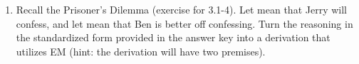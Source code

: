 \begin{enumerate}
 \opts{
\dotline

\dotline

\dotline

\dotline

\dotline

\dotline

\dotline

\dotline

\dotline

\dotline
}
{

\begin{argumentN}[1]







\end{argumentN}

}
\newpage

\item Recall the Prisoner's Dilemma (exercise for 3.1-4). Let  mean that 
 Jerry will confess, and let  mean that Ben is better off confessing.  Turn  
 the reasoning in the standardized form provided in the answer key into a 
 derivation that utilizes EM (hint: the derivation will have two premises).

 \opts{
\dotline

\dotline

\dotline

\dotline

\dotline

\dotline

\dotline

\dotline

\dotline

}
{

\begin{argumentN}[1]









\end{argumentN}

 }
 \setlength{\itemsep}{0em}
 


\end{enumerate}

